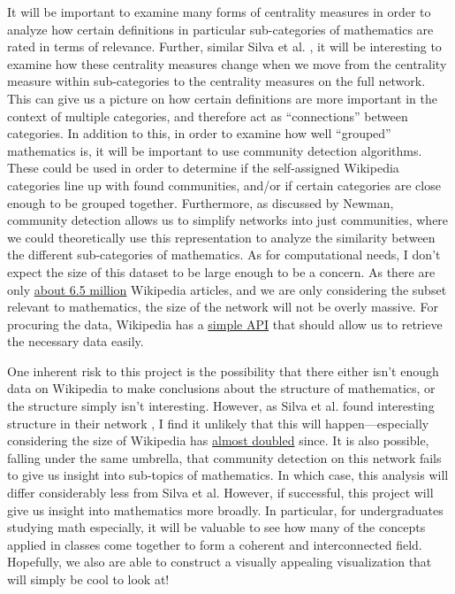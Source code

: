 \documentclass[10pt]{paper}
\begin{document}
It will be important to examine many forms of centrality measures in order to analyze how certain definitions in particular sub-categories of mathematics are rated in terms of relevance. Further, similar Silva et al. \cite{silva2011investigating}, it will be interesting to examine how these centrality measures change when we move from the centrality measure within sub-categories to the centrality measures on the full network. 
This can give us a picture on how certain definitions are more important in the context of multiple categories, and therefore act as ``connections'' between categories. In addition to this, in order to examine how well ``grouped'' mathematics is, it will be important to use community detection algorithms. These could be used in order to determine if the self-assigned Wikipedia categories line up with found communities, and/or if certain categories are close enough to be grouped together. 
Furthermore, as discussed by Newman, community detection allows us to simplify networks into just communities, where we could theoretically use this representation to analyze the similarity between the different sub-categories of mathematics. 
As for computational needs, I don't expect the size of this dataset to be large enough to be a concern. As there are only \href{https://en.wikipedia.org/wiki/Wikipedia:Size_of_Wikipedia}{about 6.5 million} Wikipedia articles, and we are only considering the subset relevant to mathematics, the size of the network will not be overly massive. 
For procuring the data, Wikipedia has a \href{https://www.mediawiki.org/wiki/API:Main_page}{simple API} that should allow us to retrieve the necessary data easily. 

One inherent risk to this project is the possibility that there either isn't enough data on Wikipedia to make conclusions about the structure of mathematics, or the structure simply isn't interesting. However, as Silva et al. found interesting structure in their network \cite{silva2011investigating}, I find it unlikely that this will happen---especially considering the size of Wikipedia has \href{https://en.wikipedia.org/wiki/Wikipedia:Size_of_Wikipedia}{almost doubled} since. 
It is also possible, falling under the same umbrella, that community detection on this network fails to give us insight into sub-topics of mathematics. In which case, this analysis will differ considerably less from Silva et al. However, if successful, this project will give us insight into mathematics more broadly. In particular, for undergraduates studying math especially, it will be valuable to see how many of the concepts applied in classes come together to form a coherent and interconnected field. 
Hopefully, we also are able to construct a visually appealing visualization that will simply be cool to look at! 

\newpage 
\printbibliography
\end{document}
